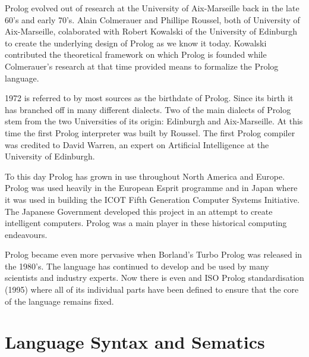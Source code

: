 \documentclass[14pt]{article}
\begin{document}
 
Prolog evolved out of research at the University of Aix-Marseille back in the late 60's and early 70's. Alain Colmerauer and Phillipe Roussel, both of University of Aix-Marseille, colaborated with Robert Kowalski of the University of Edinburgh to create the underlying design of Prolog as we know it today. Kowalski contributed the theoretical framework on which Prolog is founded while Colmerauer's research at that time provided means to formalize the Prolog language. 


1972 is referred to by most sources as the birthdate of Prolog. Since its birth it has branched off in many different dialects. Two of the main dialects of Prolog stem from the two Universities of its origin: Edinburgh and Aix-Marseille. At this time the first Prolog interpreter was built by Roussel. The first Prolog compiler was credited to David Warren, an expert on Artificial Intelligence at the University of Edinburgh. 


To this day Prolog has grown in use throughout North America and Europe. Prolog was used heavily in the European Esprit programme and in Japan where it was used in building the ICOT Fifth Generation Computer Systems Initiative. The Japanese Government developed this project in an attempt to create intelligent computers. Prolog was a main player in these historical computing endeavours. 


Prolog became even more pervasive when Borland's Turbo Prolog was released in the 1980's. The language has continued to develop and be used by many scientists and industry experts. Now there is even and ISO Prolog standardisation (1995) where all of its individual parts have been defined to ensure that the core of the language remains fixed. 
\newpage 
\section{Language Syntax and Sematics}
\end{document}
